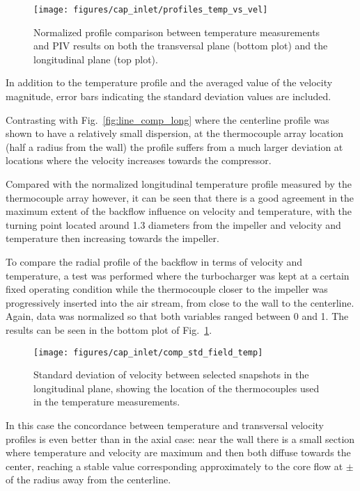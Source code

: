 \begin{figure}[t!]
\centering
\texttt{[image: figures/cap\_inlet/profiles\_temp\_vs\_vel]}
\caption[Velocity vs. temperature profile comparison]{Normalized profile comparison between temperature measurements and PIV results on both the transversal plane (bottom plot) and the longitudinal plane (top plot).}
\label{fig:profiles_temp_vs_vel}
\end{figure}

In addition to the temperature profile and the averaged value of the velocity magnitude, error bars indicating the standard deviation values are included.

Contrasting with Fig.~\ref{fig:line_comp_long} where the centerline profile was shown to have a relatively small dispersion, at the thermocouple array location (half a radius from the wall) the profile suffers from a much larger deviation at locations where the velocity increases towards the compressor.

Compared with the normalized longitudinal temperature profile measured by the thermocouple array however, it can be seen that there is a good agreement in the maximum extent of the backflow influence on velocity and temperature, with the turning point located around 1.3 diameters from the impeller and velocity and temperature then increasing towards the impeller.

To compare the radial profile of the backflow in terms of velocity and temperature, a test was performed where the turbocharger was kept at a certain fixed operating condition while the thermocouple closer to the impeller was progressively inserted into the air stream, from close to the wall to the centerline. Again, data was normalized so that both variables ranged between 0 and 1. The results can be seen in the bottom plot of Fig.~\ref{fig:profiles_temp_vs_vel}.

\begin{figure}[t!]
\centering
\texttt{[image: figures/cap\_inlet/comp\_std\_field\_temp]}
\caption[Field of standard deviation of velocity]{Standard deviation of velocity between selected snapshots in the longitudinal plane, showing the location of the thermocouples used in the temperature measurements.}
\label{fig:comp_std_field_temp}
\end{figure}

In this case the concordance between temperature and transversal velocity profiles is even better than in the axial case: near the wall there is a small section where temperature and velocity are maximum and then both diffuse towards the center, reaching a stable value corresponding approximately to the core flow at $\pm$ of the radius away from the centerline.

